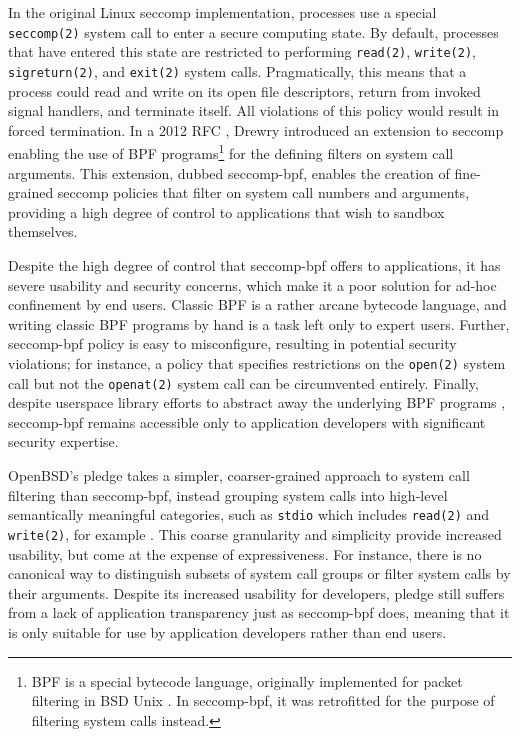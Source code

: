 \documentclass[dvipsnames, 12pt]{article}
\begin{document}
In the original Linux seccomp implementation, processes use a special
\texttt{seccomp(2)} system call to enter a secure computing state. By default,
processes that have entered this state are restricted to performing
\texttt{read(2)}, \texttt{write(2)}, \texttt{sigreturn(2)}, and \texttt{exit(2)}
system calls.  Pragmatically, this means that a process could read and write on
its open file descriptors, return from invoked signal handlers, and terminate
itself. All violations of this policy would result in forced termination. In
a 2012 RFC \cite{drewry2012_seccomp_bpf}, Drewry introduced an extension to
seccomp enabling the use of BPF programs\footnote{BPF is a special bytecode
language, originally implemented for packet filtering in BSD Unix
\cite{classic_bpf}. In seccomp-bpf, it was retrofitted for the purpose of
filtering system calls instead.} for the defining filters on system call
arguments. This extension, dubbed seccomp-bpf, enables the creation of
fine-grained seccomp policies that filter on system call numbers and arguments,
providing a high degree of control to applications that wish to sandbox
themselves.

Despite the high degree of control that seccomp-bpf offers to applications, it
has severe usability and security concerns, which make it a poor solution for
ad-hoc confinement by end users. Classic BPF \cite{classic_bpf} is a rather
arcane bytecode language, and writing classic BPF programs by hand is a task
left only to expert users. Further, seccomp-bpf policy is easy to misconfigure,
resulting in potential security violations; for instance, a policy that
specifies restrictions on the \texttt{open(2)} system call but not the
\texttt{openat(2)} system call can be circumvented entirely. Finally, despite
userspace library efforts to abstract away the underlying BPF programs
\cite{libseccomp}, seccomp-bpf remains accessible only to application developers
with significant security expertise.

OpenBSD's pledge \cite{pledge} takes a simpler, coarser-grained approach to
system call filtering than seccomp-bpf, instead grouping system calls into
high-level semantically meaningful categories, such as \texttt{stdio} which
includes \texttt{read(2)} and \texttt{write(2)}, for example
\cite{anderson2017_comparison}. This coarse granularity and simplicity provide
increased usability, but come at the expense of expressiveness. For instance,
there is no canonical way to distinguish subsets of system call groups or filter
system calls by their arguments.  Despite its increased usability for
developers, pledge still suffers from a lack of application transparency just as
seccomp-bpf does, meaning that it is only suitable for use by application
developers rather than end users.
\end{document}
